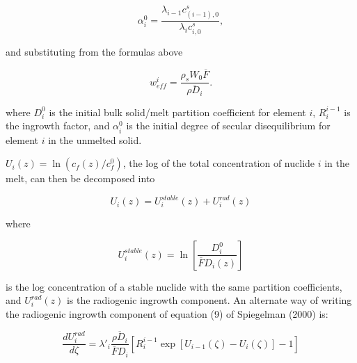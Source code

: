 \documentclass[draft]{agujournal2019}
\begin{document}
\begin{linenomath*}
\begin{equation}
    \alpha_i^0 = \frac{\lambda_{i-1} c_{(i-1),0}^s}{\lambda_i c_{i,0}^s} ,\label{eq:13}
\end{equation}
\end{linenomath*}

and substituting from the formulas above

\begin{linenomath*}
\begin{equation}
    w_{eff}^i = \frac{\rho_s W_0 \overline{F}}{\overline{\rho D_i}} .\label{eq:14}
\end{equation}
\end{linenomath*}

where $D_i^0$ is the initial bulk solid/melt partition coefficient for element $i$, $R_i^{i-1}$ is the ingrowth factor, and $\alpha_i^0$ is the initial degree of secular disequilibrium for element $i$ in the unmelted solid.

$U_i(z) = \ln(c_f(z)/c_f^0)$, the log of the total concentration of nuclide $i$ in the melt, can then be decomposed into

\begin{linenomath*}
\begin{equation}
  U_i(z) = U^{stable}_i(z) + U^{rad}_i(z)\label{eq:15}
\end{equation}
\end{linenomath*}

where

\begin{linenomath*}
\begin{equation}
    U^{stable}_i(z) = \ln\left[ \frac{D_i^0}{\overline{F}D_i(z)}\right]\label{eq:16}
\end{equation}
\end{linenomath*}

is the log concentration of a stable nuclide with the same partition coefficients, and $U^{rad}_i(z)$ is the radiogenic ingrowth component. An alternate way of writing the radiogenic ingrowth component of equation (9) of Spiegelman (2000) is:

\begin{linenomath*}
\begin{equation}
    \frac{dU_i^{rad}}{d\zeta} = \lambda'_i\frac{\overline{\rho D_{i}}}{\overline{F} D_{i}}\left[R_i^{i-1}\exp[U_{i-1}(\zeta)-U_i(\zeta)] - 1\right]\label{eq:17}
\end{equation}
\end{linenomath*}
\end{document}
